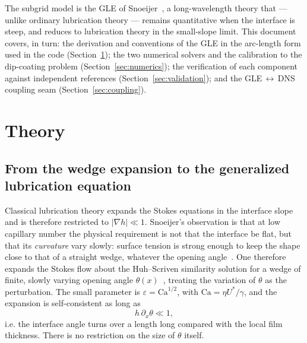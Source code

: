 \documentclass[11pt,a4paper]{article}
\newcommand{\Ca}{\mathrm{Ca}}
\begin{document}
The subgrid model is the GLE of Snoeijer~\cite{snoeijer2006}, a long-wavelength
theory that --- unlike ordinary lubrication theory --- remains quantitative
when the interface is steep, and reduces to lubrication theory in the
small-slope limit. This document covers, in turn: the derivation and
conventions of the GLE in the arc-length form used in the code
(Section~\ref{sec:theory}); the two numerical solvers and the calibration to
the dip-coating problem (Section~\ref{sec:numerics}); the verification of each
component against independent references (Section~\ref{sec:validation}); and
the GLE\,$\leftrightarrow$\,DNS coupling seam (Section~\ref{sec:coupling}).

\section{Theory}
\label{sec:theory}

\subsection{From the wedge expansion to the generalized lubrication equation}

Classical lubrication theory expands the Stokes equations in the interface
slope and is therefore restricted to $|\nabla h| \ll 1$. Snoeijer's
observation is that at low capillary number the physical requirement is not
that the interface be flat, but that its \emph{curvature} vary slowly: surface
tension is strong enough to keep the shape close to that of a straight wedge,
whatever the opening angle~\cite{snoeijer2006}. One therefore expands the
Stokes flow about the Huh--Scriven similarity solution for a wedge of finite,
slowly varying opening angle $\theta(x)$~\cite{huhscriven1971}, treating the
variation of $\theta$ as the perturbation. The small parameter is
$\varepsilon = \Ca^{1/2}$, with $\Ca = \eta U^{*}/\gamma$, and the expansion is
self-consistent as long as
\begin{equation}
  h \, \partial_x \theta \ll 1,
  \label{eq:validity}
\end{equation}
i.e. the interface angle turns over a length long compared with the local film
thickness. There is no restriction on the size of $\theta$ itself.
\end{document}
